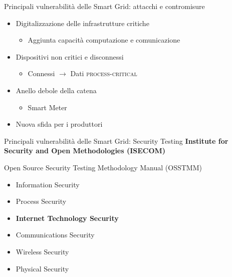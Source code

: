 

\begin{frame}{Principali vulnerabilità delle Smart Grid: attacchi e contromisure}
	\begin{itemize}[<+- | alert@+>]
		\item Digitalizzazione delle infrastrutture critiche
		\begin{itemize}
			\item Aggiunta capacità computazione e comunicazione
		\end{itemize}
		\item Dispositivi non critici e disconnessi
		\begin{itemize}
			\item Connessi $\rightarrow$ Dati \textsc{process-critical}
		\end{itemize}
		\item Anello debole della catena
		\begin{itemize}
			\item Smart Meter
		\end{itemize}
		\item Nuova sfida per i produttori
	\end{itemize}
\end{frame}



\begin{frame}{Principali vulnerabilità delle Smart Grid: Security Testing}
		\textbf{Institute for Security and Open Methodologies (ISECOM)}
		\begin{block}{Open Source Security Testing Methodology Manual (OSSTMM)}
			\begin{itemize}
				\item Information Security
				\item Process Security
				\item \textbf{Internet Technology Security}
				\item Communications Security
				\item Wireless Security
				\item Physical Security
			\end{itemize}
			\end{block}
\end{frame}

